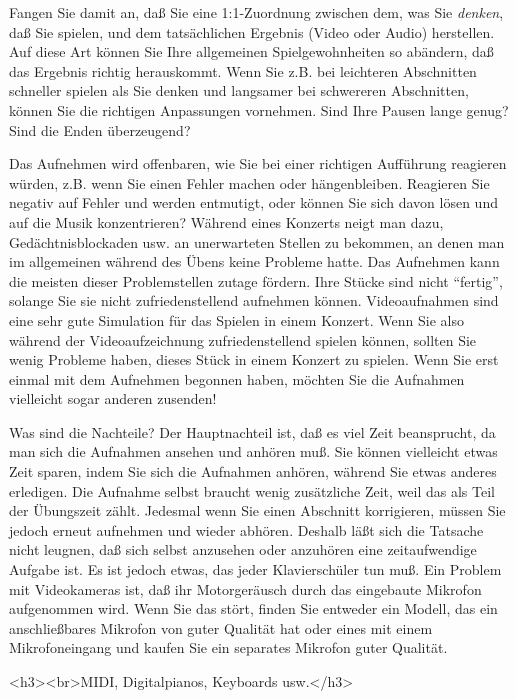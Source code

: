 Fangen Sie damit an, daß Sie eine 1:1-Zuordnung zwischen dem, was Sie \textit{denken}, daß Sie spielen, und dem tatsächlichen Ergebnis (Video oder Audio) herstellen.
Auf diese Art können Sie Ihre allgemeinen Spielgewohnheiten so abändern, daß das Ergebnis richtig herauskommt.
Wenn Sie z.B. bei leichteren Abschnitten schneller spielen als Sie denken und langsamer bei schwereren Abschnitten, können Sie die richtigen Anpassungen vornehmen.
Sind Ihre Pausen lange genug?
Sind die Enden überzeugend?

Das Aufnehmen wird offenbaren, wie Sie bei einer richtigen Aufführung reagieren würden, z.B. wenn Sie einen Fehler machen oder hängenbleiben.
Reagieren Sie negativ auf Fehler und werden entmutigt, oder können Sie sich davon lösen und auf die Musik konzentrieren?
Während eines Konzerts neigt man dazu, Gedächtnisblockaden usw. an unerwarteten Stellen zu bekommen, an denen man im allgemeinen während des Übens keine Probleme hatte.
Das Aufnehmen kann die meisten dieser Problemstellen zutage fördern.
Ihre Stücke sind nicht \enquote{fertig}, solange Sie sie nicht zufriedenstellend aufnehmen können.
Videoaufnahmen sind eine sehr gute Simulation für das Spielen in einem Konzert.
Wenn Sie also während der Videoaufzeichnung zufriedenstellend spielen können, sollten Sie wenig Probleme haben, dieses Stück in einem Konzert zu spielen.
Wenn Sie erst einmal mit dem Aufnehmen begonnen haben, möchten Sie die Aufnahmen vielleicht sogar anderen zusenden!

Was sind die Nachteile?
Der Hauptnachteil ist, daß es viel Zeit beansprucht, da man sich die Aufnahmen ansehen und anhören muß.
Sie können vielleicht etwas Zeit sparen, indem Sie sich die Aufnahmen anhören, während Sie etwas anderes erledigen.
Die Aufnahme selbst braucht wenig zusätzliche Zeit, weil das als Teil der Übungszeit zählt.
Jedesmal wenn Sie einen Abschnitt korrigieren, müssen Sie jedoch erneut aufnehmen und wieder abhören.
Deshalb läßt sich die Tatsache nicht leugnen, daß sich selbst anzusehen oder anzuhören eine zeitaufwendige Aufgabe ist.
Es ist jedoch etwas, das jeder Klavierschüler tun muß.
Ein Problem mit Videokameras ist, daß ihr Motorgeräusch durch das eingebaute Mikrofon aufgenommen wird.
Wenn Sie das stört, finden Sie entweder ein Modell, das ein anschließbares Mikrofon von guter Qualität hat oder eines mit einem  Mikrofoneingang und kaufen Sie ein separates Mikrofon guter Qualität.


\label{c1iii13MIDI}

<h3><br>MIDI, Digitalpianos, Keyboards usw.</h3>

